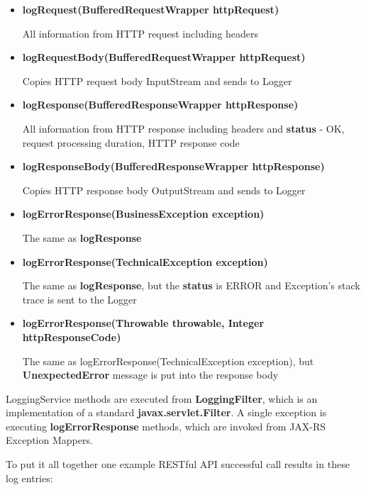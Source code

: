 	\begin{itemize}
		\item \textbf{logRequest(BufferedRequestWrapper httpRequest)}
		
		All information from HTTP request including headers
		\item \textbf{logRequestBody(BufferedRequestWrapper httpRequest)}
		
		Copies HTTP request body InputStream and sends to Logger
		\item \textbf{logResponse(BufferedResponseWrapper httpResponse)}
		
		All information from HTTP response including headers and \textbf{status} - OK, request processing duration, HTTP
		response code
		\item \textbf{logResponseBody(BufferedResponseWrapper httpResponse)}
		
		Copies HTTP response body OutputStream and sends to Logger
		\item \textbf{logErrorResponse(BusinessException exception)}
		
		The same as \textbf{logResponse}
		\item \textbf{logErrorResponse(TechnicalException exception)}
		
		The same as \textbf{logResponse}, but the \textbf{status} is ERROR and Exception's stack trace is sent to the Logger
		\item \textbf{logErrorResponse(Throwable throwable, Integer httpResponseCode)}
		
		The same as logErrorResponse(TechnicalException exception), but \textbf{UnexpectedError} message is put into the
		response body
	\end{itemize}

	LoggingService methods are executed from \textbf{LoggingFilter}, which is an implementation of a standard
	\textbf{javax.servlet.Filter}. A single exception is executing \textbf{logErrorResponse} methods, which are invoked
	from JAX-RS Exception Mappers.
	
	To put it all together one example RESTful API successful call results in these log entries:
	
